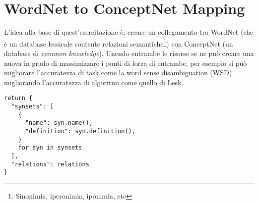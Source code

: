\chapter{WordNet to ConceptNet Mapping}

L'idea alla base di quest'esercitazione è: creare un collegamento tra WordNet (che è un database lessicale contente relazioni semantiche\footnote{Sinonimia, iperonimia, iponimia, etc}) con ConceptNet (un database di \textit{common knowledge}). Unendo entrambe le risorse se ne può creare una nuova in grado di massimizzare i punti di forza di entrambe, per esempio si può migliorare l'accuratezza di task come la word sense disambiguation (WSD) migliorando l'accuratezza di algoritmi come quello di Lesk.

\begin{lstlisting}[caption = The new resource obtain from the combination of WordNet and ConceptNet]
return {
  "synsets": [
    {
      "name": syn.name(),
      "definition": syn.definition(),
    }
    for syn in synsets
  ],
  "relations": relations
}

\end{lstlisting}
